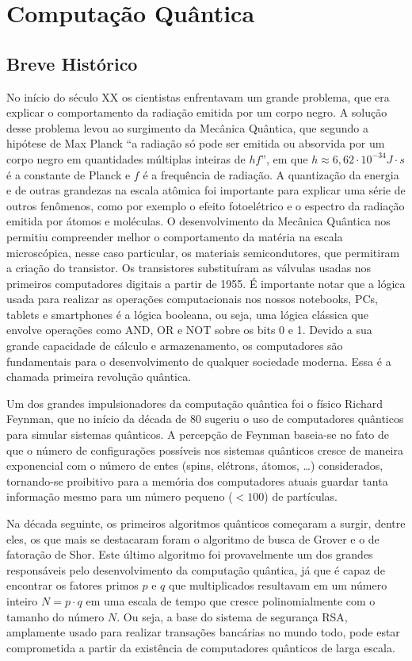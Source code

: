 \chapter{Computação Quântica}\label{ch:computacao-quantica}

\section{Breve Histórico}\label{sec:breve-historico}

No início do século XX os cientistas enfrentavam um grande problema, que
era explicar o comportamento da radiação emitida por um corpo negro.
A solução desse problema levou ao surgimento da Mecânica Quântica, que
segundo a hipótese de Max Planck ``a radiação só pode ser emitida ou
absorvida por um corpo negro em quantidades múltiplas inteiras de
\(hf\)'', em que \(h \approx 6,62 \cdot 10^{-34} J \cdot s\) é a
constante de Planck e \(f\) é a frequência de radiação.
A quantização da energia e de outras grandezas na escala atômica foi importante para
explicar uma série de outros fenômenos, como por exemplo o efeito
fotoelétrico e o espectro da radiação emitida por átomos e moléculas.
O desenvolvimento da Mecânica Quântica nos permitiu compreender melhor o
comportamento da matéria na escala microscópica, nesse caso particular,
os materiais semicondutores, que permitiram a criação do transistor.
Os transistores substituíram as válvulas usadas nos primeiros computadores
digitais a partir de 1955.
É importante notar que a lógica usada para realizar as operações computacionais nos nossos notebooks, PCs, tablets e smartphones é a lógica booleana, ou seja, uma lógica clássica que
envolve operações como AND, OR e NOT sobre os bits 0 e 1.
Devido a sua grande capacidade de cálculo e armazenamento, os computadores são
fundamentais para o desenvolvimento de qualquer sociedade moderna.
Essa é a chamada primeira revolução quântica.

Um dos grandes impulsionadores da computação quântica foi o físico
Richard Feynman, que no início da década de 80 sugeriu o uso de
computadores quânticos para simular sistemas quânticos.
A percepção de Feynman baseia-se no fato de que o número de configurações possíveis nos
sistemas quânticos cresce de maneira exponencial com o número de entes
(spins, elétrons, átomos, \ldots) considerados, tornando-se proibitivo para
a memória dos computadores atuais guardar tanta informação mesmo para um
número pequeno (\(< 100\)) de partículas.

Na década seguinte, os primeiros algoritmos quânticos começaram a
surgir, dentre eles, os que mais se destacaram foram o algoritmo de
busca de Grover e o de fatoração de Shor.
Este último algoritmo foi provavelmente um dos grandes responsáveis pelo desenvolvimento da
computação quântica, já que é capaz de encontrar os fatores primos \(p\)
e \(q\) que multiplicados resultavam em um número inteiro
\(N = p \cdot q\) em uma escala de tempo que cresce polinomialmente com
o tamanho do número \(N\).
Ou seja, a base do sistema de segurança RSA, amplamente usado para realizar transações bancárias no mundo todo, pode estar comprometida a partir da existência de computadores quânticos de
larga escala.


